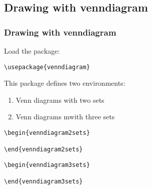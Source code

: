 \subsection{Drawing with venndiagram}

\begin{frame}[fragile]
\frametitle{Drawing with venndiagram}

Load the package:

\begin{lstlisting}
\usepackage{venndiagram}
\end{lstlisting}


This package defines two environments:

\begin{enumerate}
	\item Venn diagrams with two sets
	\item Venn diagrams mwith three sets
\end{enumerate}

\begin{lstlisting}
\begin{venndiagram2sets}

\end{venndiagram2sets}
\end{lstlisting}

\begin{lstlisting}
\begin{venndiagram3sets}

\end{venndiagram3sets}
\end{lstlisting}

\end{frame}


